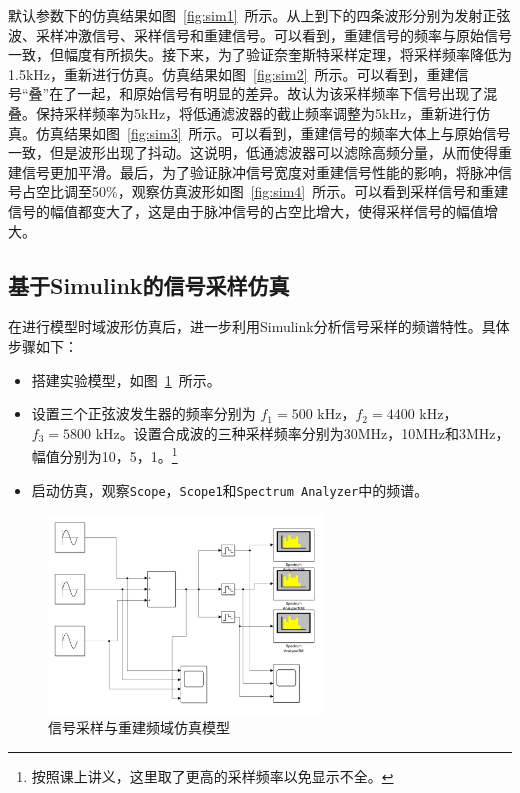 \documentclass[lang=cn,newtx,10pt,scheme=chinese]{elegantbook}
\begin{document}
默认参数下的仿真结果如图~\ref{fig:sim1}~所示。从上到下的四条波形分别为发射正弦波、采样冲激信号、采样信号和重建信号。可以看到，重建信号的频率与原始信号一致，但幅度有所损失。接下来，为了验证奈奎斯特采样定理，将采样频率降低为1.5kHz，重新进行仿真。仿真结果如图~\ref{fig:sim2}~所示。可以看到，重建信号“叠”在了一起，和原始信号有明显的差异。故认为该采样频率下信号出现了混叠。保持采样频率为5kHz，将低通滤波器的截止频率调整为5kHz，重新进行仿真。仿真结果如图~\ref{fig:sim3}~所示。可以看到，重建信号的频率大体上与原始信号一致，但是波形出现了抖动。这说明，低通滤波器可以滤除高频分量，从而使得重建信号更加平滑。最后，为了验证脉冲信号宽度对重建信号性能的影响，将脉冲信号占空比调至50\%，观察仿真波形如图~\ref{fig:sim4}~所示。可以看到采样信号和重建信号的幅值都变大了，这是由于脉冲信号的占空比增大，使得采样信号的幅值增大。


\subsection{基于Simulink的信号采样仿真}

在进行模型时域波形仿真后，进一步利用Simulink分析信号采样的频谱特性。具体步骤如下：
\begin{itemize}
  \item 搭建实验模型，如图~\ref{fig:model2}~所示。
  \item 设置三个正弦波发生器的频率分别为 $f_1 = 500$ kHz，$f_2 = 4400$ kHz，$f_3 = 5800$ kHz。设置合成波的三种采样频率分别为30MHz，10MHz和3MHz，幅值分别为10，5，1。\footnote{按照课上讲义，这里取了更高的采样频率以免显示不全。}
  \item 启动仿真，观察\lstinline{Scope}，\lstinline{Scope1}和\lstinline{Spectrum Analyzer}中的频谱。

\end{itemize}

\begin{figure}[htbp]
  \centering
  \includegraphics[width=0.65\textwidth]{figure/exp1/model2.png}
  \caption{信号采样与重建频域仿真模型}
  \label{fig:model2}
\end{figure}
\end{document}
